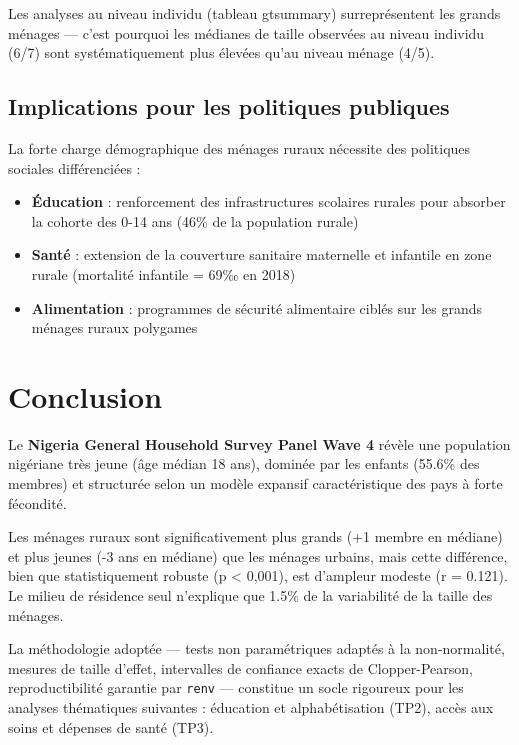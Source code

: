 \documentclass[
  10pt,
]{article}
\providecommand{\tightlist}{%
  \setlength{\itemsep}{0pt}\setlength{\parskip}{0pt}}\usepackage{longtable,booktabs,array}
\begin{document}
Les analyses au niveau individu (tableau gtsummary) surreprésentent les
grands ménages --- c'est pourquoi les médianes de taille observées au
niveau individu (6/7) sont systématiquement plus élevées qu'au niveau
ménage (4/5).

\subsection{Implications pour les politiques
publiques}\label{implications-pour-les-politiques-publiques}

La forte charge démographique des ménages ruraux nécessite des
politiques sociales différenciées :

\begin{itemize}
\tightlist
\item
  \textbf{Éducation} : renforcement des infrastructures scolaires
  rurales pour absorber la cohorte des 0-14 ans (46\% de la population
  rurale)
\item
  \textbf{Santé} : extension de la couverture sanitaire maternelle et
  infantile en zone rurale (mortalité infantile = 69‰ en 2018)
\item
  \textbf{Alimentation} : programmes de sécurité alimentaire ciblés sur
  les grands ménages ruraux polygames
\end{itemize}

\newpage{}

\section{Conclusion}\label{conclusion}

Le \textbf{Nigeria General Household Survey Panel Wave 4} révèle une
population nigériane très jeune (âge médian 18 ans), dominée par les
enfants (55.6\% des membres) et structurée selon un modèle expansif
caractéristique des pays à forte fécondité.

Les ménages ruraux sont significativement plus grands (+1 membre en
médiane) et plus jeunes (-3 ans en médiane) que les ménages urbains,
mais cette différence, bien que statistiquement robuste (p \textless{}
0,001), est d'ampleur modeste (r = 0.121). Le milieu de résidence seul
n'explique que 1.5\% de la variabilité de la taille des ménages.

La méthodologie adoptée --- tests non paramétriques adaptés à la
non-normalité, mesures de taille d'effet, intervalles de confiance
exacts de Clopper-Pearson, reproductibilité garantie par \texttt{renv}
--- constitue un socle rigoureux pour les analyses thématiques suivantes
: éducation et alphabétisation (TP2), accès aux soins et dépenses de
santé (TP3).
\end{document}

